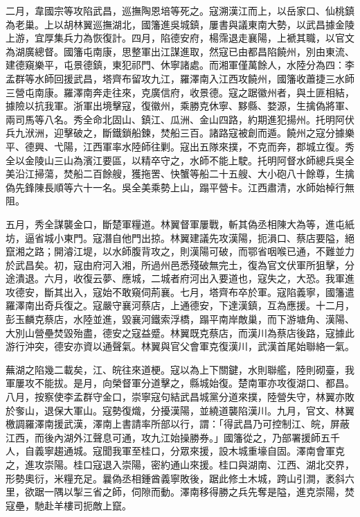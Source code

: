 \begin{pinyinscope}
二月，韋國宗等攻陷武昌，巡撫陶恩培等死之。寇溯漢江而上，以岳家口、仙桃鎮為老巢。上以胡林翼巡撫湖北，國籓進吳城鎮，屢書與議東南大勢，以武昌據金陵上游，宜厚集兵力為恢復計。四月，陷德安府，楊霈退走襄陽，上褫其職，以官文為湖廣總督。國籓屯南康，思整軍出江謀進取，然寇已由都昌陷饒州，別由東流、建德窺樂平，屯景德鎮，東犯祁門、休寧諸處。而湘軍僅萬餘人，水陸分為四：李孟群等水師回援武昌，塔齊布留攻九江，羅澤南入江西攻饒州，國籓收蕭捷三水師三營屯南康。羅澤南奔走往來，克廣信府，收景德。寇之踞徽州者，與土匪相結，據險以抗我軍。浙軍出境擊寇，復徽州，乘勝克休寧、黟縣、婺源，生擒偽將軍、兩司馬等八名。秀全命北固山、鎮江、瓜洲、金山四路，約期進犯揚州。托明阿伏兵九洑洲，迎擊破之，斷鐵鎖船鍊，焚船三百。諸路寇被創而遁。饒州之寇分據樂平、德興、弋陽，江西軍率水陸師往剿。寇出五隊來撲，不克而奔，郡城立復。秀全以金陵山三山為濱江要區，以精卒守之，水師不能上駛。托明阿督水師總兵吳全美沿江掃蕩，焚船二百餘艘，獲拖罟、快蟹等船二十五艘、大小砲八十餘尊，生擒偽先鋒陳長順等六十一名。吳全美乘勢上山，蹋平營卡。江西肅清，水師始棹行無阻。

五月，秀全謀襲金口，斷楚軍糧道。林翼督軍屢戰，斬其偽丞相陳大為等，進屯紙坊，逼省城小東門。寇潛自他門出掠。林翼建議先攻漢陽，扼溳口、蔡店要隘，絕竄湘之路；開濬江堤，以水師腹背攻之，則漢陽可破，而鄂省咽喉已通，不難並力於武昌矣。初，寇由府河入湘，所過州邑悉殘破無完土，復為官文伏軍所狙擊，分途潰退。六月，收復云夢、應城，二城者府河出入要道也，寇失之，大恐。我軍進攻德安，斷其出入，寇始不敢窺伺荊襄。七月，塔齊布卒於軍。寇陷義寧，國籓遣羅澤南出奇兵復之。寇嚴守襄河蔡店，上通德安，下達漢鎮，互為應援。十二月，彭玉麟克蔡店，水陸並進，毀襄河鐵索浮橋，蹋平南岸敵巢，而下游塘角、漢陽、大別山營壘焚毀殆盡，德安之寇益蹙。林翼既克蔡店，而漢川為蔡店後路，寇據此游行沖突，德安亦資以通聲氣。林翼與官父會軍克復漢川，武漢首尾始聯絡一氣。

蕪湖之陷幾二載矣，江、皖往來道梗。寇以為上下關鍵，水則聯艦，陸則砌臺，我軍屢攻不能拔。是月，向榮督軍分道擊之，縣城始復。楚南軍亦攻復湖口、都昌。八月，按察使李孟群守金口，崇寧寇句結武昌城黨分道來撲，陸營失守，林翼亦敗於奓山，退保大軍山。寇勢復熾，分擾漢陽，並繞道襲陷漢川。九月，官文、林翼檄調羅澤南援武漢，澤南上書請率所部以行，謂：「得武昌乃可控制江、皖，屏蔽江西，而後內湖外江聲息可通，攻九江始操勝券。」國籓從之，乃部署援師五千人，自義寧趨通城。寇聞我軍至桂口，分眾來援，設木城重壕自固。澤南會軍克之，進攻崇陽。桂口寇退入崇陽，密約通山來援。桂口與湖南、江西、湖北交界，形勢奧衍，米糧充足。曩偽丞相鍾酋義寧敗後，踞此修土木城，跨山引澗，袤斜六里，欲踞一隅以掣三省之師，伺隙而動。澤南移得勝之兵先奪是隘，進克崇陽，焚寇壘，馳赴羊樓司扼敵上竄。


\end{pinyinscope}
